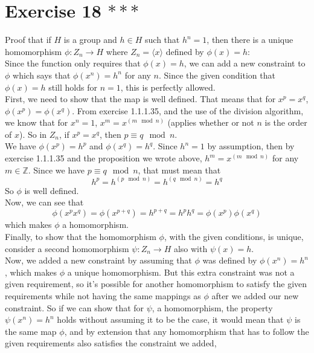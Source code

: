 \documentclass{article}
\newcommand{\Z}{\mathbb{Z}}
\begin{document}
    \section*{Exercise 18 $***$}
    Proof that if $H$ is a group and $h \in H$
    such that $h^n = 1$,
    then there is a unique homomorphism $\phi: Z_n \to H$
    where $Z_n = \langle x \rangle$ defined by $\phi(x) = h$: \\
    Since the function only requires that $\phi(x) = h$,
    we can add a new constraint to $\phi$ which says that 
    $\phi(x^n) = h^n$ for any $n$.
    Since the given condition that $\phi(x) = h$ still holds for $n = 1$,
    this is perfectly allowed. \\
    First, we need to show that the map is well defined.
    That means that for $x^p = x^q$, $\phi(x^p) = \phi(x^q)$.
    From exercise 1.1.1.35, and the use of the division
    algorithm, we know that for $x^n = 1$, $x^m = x^{(m \mod n)}$
    (applies whether or not $n$ is the order of $x$).
    So in $Z_n$, if $x^p = x^q$, then $p \equiv q \mod n$. \\
    We have $\phi(x^p) = h^p$ and $\phi(x^q) = h^q$.
    Since $h^n = 1$ by assumption, then by exercise 1.1.1.35
    and the proposition we wrote above,
    $h^m = x^{(m \mod n)}$ for any $m \in \Z$.
    Since we have $p \equiv q \mod n$, that must mean
    that
    \[ h^p = h^{(p \mod n)} = h^{(q \mod n)} = h^{q} \]
    So $\phi$ is well defined. \\
    Now, we can see that
    \[ \phi(x^px^q) = \phi(x^{p + q})
    = h^{p + q}
    = h^ph^q
    = \phi(x^p)\phi(x^q)  \]
    which makes $\phi$ a homomorphism. \\
    Finally, to show that the homomorphism $\phi$, with the given conditions,
    is unique,
    consider a second homomorphism $\psi: Z_n \to H$
    also with $\psi(x) = h$. \\
    Now, we added a new constraint by assuming that $\phi$ was
    defined by $\phi(x^n) = h^n$,
    which makes $\phi$ a unique homomorphism.
    But this extra constraint was not a given requirement,
    so it's possible for another homomorphism to satisfy
    the given requirements while not having the same mappings as $\phi$
    after we added our new constraint.
    So if we can show that for $\psi$, a homomorphism,
    the property $\psi(x^n) = h^n$ holds without assuming it to be the case,
    it would mean that $\psi$ is the same map $\phi$,
    and by extension that any homomorphism that has to follow the given
    requirements also satisfies the constraint we added,
\end{document}
